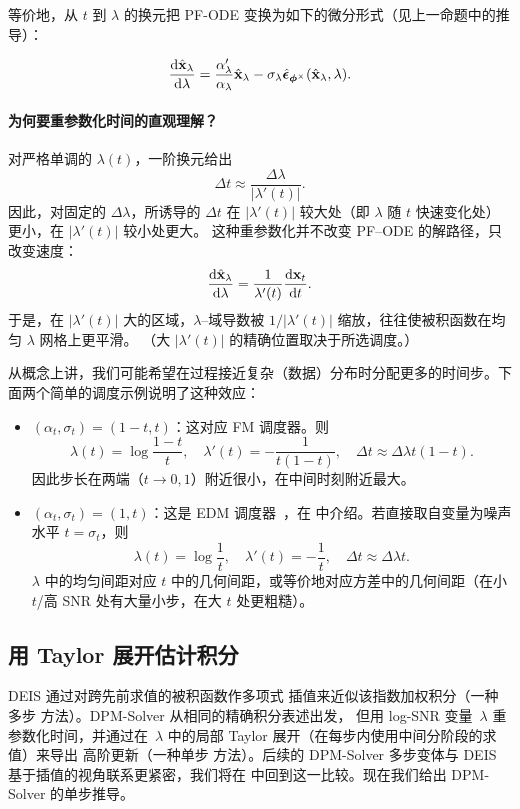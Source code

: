 等价地，从 $t$ 到 $\lambda$ 的换元把 PF-ODE 变换为如下的微分形式（见上一命题中的推导）：
\begin{mdframed}
\begin{align}\label{eq:diffusion_ode_lambda_eps}
\frac{\mathop{}\!\mathrm{d} \hat{{\mathbf{x}}}_\lambda}{\mathop{}\!\mathrm{d} \lambda}
= \frac{\alpha_\lambda'}{\alpha_\lambda} \hat{{\mathbf{x}}}_\lambda
- \sigma_\lambda \hat{\bm{\epsilon}}_{\bm{\phi}^\times}(\hat{{\mathbf{x}}}_\lambda, \lambda).
\end{align}
\end{mdframed}


\paragraph{为何要重参数化时间的直观理解？}
对严格单调的 $\lambda(t)$，一阶换元给出
\[
\Delta t  \approx  \frac{\Delta\lambda}{ |\lambda'(t)| }.
\]
因此，对固定的 $\Delta\lambda$，所诱导的 $\Delta t$ 在 $|\lambda'(t)|$ 较大处（即 $\lambda$ 随 $t$ 快速变化处）更小，在 $|\lambda'(t)|$ 较小处更大。
这种重参数化并不改变 PF--ODE 的解路径，只改变速度：
\[
\frac{\mathop{}\!\mathrm{d} \hat{{\mathbf{x}}}_\lambda}{\mathop{}\!\mathrm{d} \lambda}
= \frac{1}{\lambda'(t)} \frac{\mathop{}\!\mathrm{d} {\mathbf{x}}_t}{\mathop{}\!\mathrm{d} t}.
\]
于是，在 $|\lambda'(t)|$ 大的区域，$\lambda$--域导数被 $1/|\lambda'(t)|$ 缩放，往往使被积函数在均匀 $\lambda$ 网格上更平滑。
（大 $|\lambda'(t)|$ 的精确位置取决于所选调度。）

从概念上讲，我们可能希望在过程接近复杂（数据）分布时分配更多的时间步。下面两个简单的调度示例说明了这种效应：
\begin{itemize}
\item $(\alpha_t,\sigma_t)=(1-t, t)$：这对应 FM 调度器。则
\[
\lambda(t)=\log\frac{1-t}{t},\quad 
\lambda'(t)=-\frac{1}{t(1-t)},\quad
\Delta t \approx \Delta\lambda   t(1-t).
\]
因此步长在两端（$t\to 0,1$）附近很小，在中间时刻附近最大。

\item $(\alpha_t,\sigma_t)=(1, t)$：这是 EDM 调度器~\citep{karras2022elucidating}，在  中介绍。若直接取自变量为噪声水平 $t=\sigma_t$，则
\[
\lambda(t)=\log\frac{1}{t},\quad 
\lambda'(t)=-\frac{1}{t},\quad
\Delta t \approx \Delta\lambda   t.
\]
$\lambda$ 中的均匀间距对应 $t$ 中的几何间距，或等价地对应方差中的几何间距（在小 $t$/高 SNR 处有大量小步，在大 $t$ 处更粗糙）。
\end{itemize}




\subsection{用 Taylor 展开估计积分}\label{subsec:dpm-method-2} 
DEIS 通过对跨先前求值的被积函数作多项式
插值来近似该指数加权积分（一种多步
方法）。DPM-Solver 从相同的精确积分表述出发，
但用 log-SNR 变量~$\lambda$ 重参数化时间，并通过在~$\lambda$ 中的局部 Taylor 展开（在每步内使用中间分阶段的求值）来导出
高阶更新（一种单步
方法）。后续的 DPM-Solver 多步变体与 DEIS 基于插值的视角联系更紧密，我们将在  中回到这一比较。现在我们给出 DPM-Solver 的单步推导。



